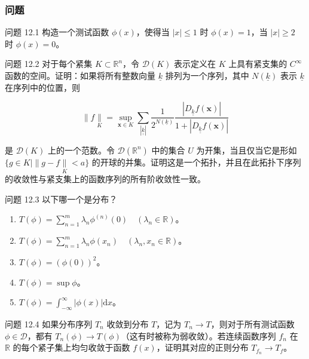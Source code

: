 \subsubsection{问题}\label{ux95eeux9898}

问题 12.1 构造一个测试函数 \(\phi(x)\)，使得当 \(|x| \leq 1\) 时
\(\phi(x) = 1\)，当 \(|x| \geq 2\) 时 \(\phi(x) = 0\)。

问题 12.2 对于每个紧集 \(K \subset \mathbb{R}^{n}\)，令
\(\mathcal{D}(K)\) 表示定义在 \(K\) 上具有紧支集的 \(C^{\infty}\)
函数的空间。证明：如果将所有整数向量 \(\underline{k}\)
排列为一个序列，其中 \(N\left( \underline{k} \right)\) 表示
\(\underline{k}\) 在序列中的位置，则

\[\parallel f\underset{K}{\parallel} = \sup\limits_{\mathbf{x} \in K}\sum_{\left| \underline{\underline{k}} \right|}\frac{1}{2^{N\left( \underline{k} \right)}}\frac{\left| D_{\underline{\underline{k}}}f\left( \mathbf{x} \right) \right|}{1 + \left| D_{\underline{\underline{k}}}f\left( \mathbf{x} \right) \right|}\]

是 \(\mathcal{D}(K)\) 上的一个范数。令
\(\mathcal{D}\left( \mathbb{R}^{n} \right)\) 中的集合 \(U\)
为开集，当且仅当它是形如
\(\{ g \in K \mid \parallel g - f\underset{K}{\parallel} < a\}\)
的开球的并集。证明这是一个拓扑，并且在此拓扑下序列的收敛性与紧支集上的函数序列的所有阶收敛性一致。

问题 12.3 以下哪一个是分布？

\begin{enumerate}
\def\labelenumi{(\alph{enumi})}
\item
  \(T(\phi) = \sum_{n = 1}^{m}\lambda_{n}\phi^{(n)}(0)\quad\left( \lambda_{n} \in \mathbb{R} \right)\)。
\item
  \(T(\phi) = \sum_{n = 1}^{m}\lambda_{n}\phi\left( x_{n} \right)\quad\left( \lambda_{n},x_{n} \in \mathbb{R} \right)\)。
\item
  \(T(\phi) = \left( \phi(0) \right)^{2}\)。
\item
  \(T(\phi) = \sup\phi\)。
\item
  \(T(\phi) = \int_{- \infty}^{\infty}\left| \phi(x) \right|\mathrm{d}x\)。
\end{enumerate}

问题 12.4 如果分布序列 \(T_{n}\) 收敛到分布 \(T\)，记为
\(T_{n} \rightarrow T\)，则对于所有测试函数
\(\phi \in \mathcal{D}\)，都有
\(T_{n}(\phi) \rightarrow T(\phi)\)（这有时被称为弱收敛）。若连续函数序列
\(f_{n}\) 在 \(\mathbb{R}\) 的每个紧子集上均匀收敛于函数
\(f(x)\)，证明其对应的正则分布 \(T_{f_{n}} \rightarrow T_{f}\)。

